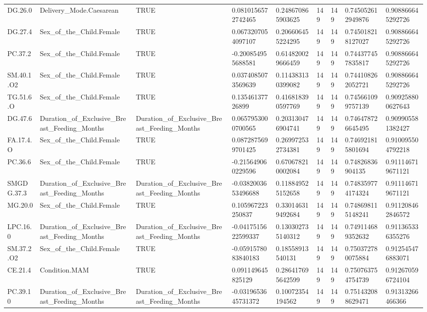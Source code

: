 \begin{longtable}{lllllllll}
DG.26.0 & Delivery\_Mode.Caesarean & TRUE & 0.0810156572742465 & 0.248670865903625 & 149 & 149 & 0.745052612949876 & 0.908866645292726 \\
DG.27.4 & Sex\_of\_the\_Child.Female & TRUE & 0.0673207054097107 & 0.206606455224295 & 149 & 149 & 0.745018218127027 & 0.908866645292726 \\
PC.37.2 & Sex\_of\_the\_Child.Female & TRUE & -0.200854955688581 & 0.614820029666459 & 149 & 149 & 0.744377457835817 & 0.908866645292726 \\
SM.40.1.O2 & Sex\_of\_the\_Child.Female & TRUE & 0.0374085073569639 & 0.114383130399082 & 149 & 149 & 0.744108262052721 & 0.908866645292726 \\
TG.51.6.O & Sex\_of\_the\_Child.Female & TRUE & 0.13546137726899 & 0.416818390597769 & 149 & 149 & 0.745661099757139 & 0.909258800627643 \\
DG.47.6 & Duration\_of\_Exclusive\_Breast\_Feeding\_Months & Duration\_of\_Exclusive\_Breast\_Feeding\_Months & 0.0657953000700565 & 0.203130476904741 & 149 & 149 & 0.746478726645495 & 0.909905581382427 \\
FA.17.4.O & Sex\_of\_the\_Child.Female & TRUE & 0.0872875699701425 & 0.269972532734381 & 149 & 149 & 0.746921815801694 & 0.910095504792218 \\
PC.36.6 & Sex\_of\_the\_Child.Female & TRUE & -0.215649060229596 & 0.670678210002084 & 149 & 149 & 0.74826836904135 & 0.911146719671121 \\
SMGDG.37.3 & Duration\_of\_Exclusive\_Breast\_Feeding\_Months & Duration\_of\_Exclusive\_Breast\_Feeding\_Months & -0.0382003653496688 & 0.118849525152658 & 149 & 149 & 0.748359774174324 & 0.911146719671121 \\
MG.20.0 & Sex\_of\_the\_Child.Female & TRUE & 0.105967223250837 & 0.330146319492684 & 149 & 149 & 0.748698115148241 & 0.911208462846572 \\
LPC.16.0 & Duration\_of\_Exclusive\_Breast\_Feeding\_Months & Duration\_of\_Exclusive\_Breast\_Feeding\_Months & -0.0417515622599337 & 0.130302735140312 & 149 & 149 & 0.749114689352632 & 0.911365336355276 \\
SM.37.2.O2 & Sex\_of\_the\_Child.Female & TRUE & -0.0591578083840183 & 0.18558913540131 & 149 & 149 & 0.750372780075884 & 0.912545476883071 \\
CE.21.4 & Condition.MAM & TRUE & 0.091149645825129 & 0.286417695642599 & 149 & 149 & 0.750763754754739 & 0.912670596724104 \\
PC.39.10 & Duration\_of\_Exclusive\_Breast\_Feeding\_Months & Duration\_of\_Exclusive\_Breast\_Feeding\_Months & -0.0319653645731372 & 0.10072354194562 & 149 & 149 & 0.751432088629471 & 0.91313266466366 \\

\end{longtable}
